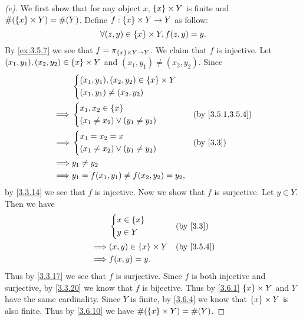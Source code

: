 \begin{proof}[(e)]
	We first show that for any object \(x\), \(\left\lbrace x\right\rbrace \times Y\) is finite and \(\#(\left\lbrace x\right\rbrace \times Y) = \#(Y)\).
	Define \(f : \left\lbrace x\right\rbrace \times Y \to Y\) as follow:
	\[
		\forall (z, y) \in \left\lbrace x\right\rbrace \times Y, f(z, y) = y.
	\]
	By \cref{ex:3.5.7} we see that \(f = \pi_{\left\lbrace x\right\rbrace \times Y \to Y}\).
	We claim that \(f\) is injective.
	Let \((x_1, y_1), (x_2, y_2) \in \left\lbrace x\right\rbrace \times Y\) and \((x_1, y_1) \neq (x_2, y_2)\).
	Since
	\begin{align*}
		         & \begin{dcases}
			           (x_1, y_1), (x_2, y_2) \in \set{x} \times Y \\
			           (x_1, y_1) \neq (x_2, y_2)
		           \end{dcases}    \\
		\implies & \begin{dcases}
			           x_1, x_2 \in \set{x} \\
			           (x_1 \neq x_2) \lor (y_1 \neq y_2)
		           \end{dcases}             &  & \by{3.5.1,3.5.4} \\
		\implies & \begin{dcases}
			           x_1 = x_2 = x \\
			           (x_1 \neq x_2) \lor (y_1 \neq y_2)
		           \end{dcases}             &  & \by{3.3}         \\
		\implies & y_1 \neq y_2                                   \\
		\implies & y_1 = f(x_1, y_1) \neq f(x_2, y_2) = y_2,
	\end{align*}
	by \cref{3.3.14} we see that \(f\) is injective.
	Now we show that \(f\) is surjective.
	Let \(y \in Y\).
	Then we have
	\begin{align*}
		         & \begin{dcases}
			           x \in \set{x} \\
			           y \in Y
		           \end{dcases}            &  & \by{3.3}       \\
		\implies & (x, y) \in \set{x} \times Y &  & \by{3.5.4} \\
		\implies & f(x, y) = y.
	\end{align*}
	Thus by \cref{3.3.17} we see that \(f\) is surjective.
	Since \(f\) is both injective and surjective, by \cref{3.3.20} we know that \(f\) is bijective.
	Thus by \cref{3.6.1} \(\left\lbrace x\right\rbrace \times Y\) and \(Y\) have the same cardinality.
	Since \(Y\) is finite, by \cref{3.6.4} we know that \(\left\lbrace x\right\rbrace \times Y\) is also finite.
	Thus by \cref{3.6.10} we have \(\#(\left\lbrace x\right\rbrace \times Y) = \#(Y)\).


\end{proof}
